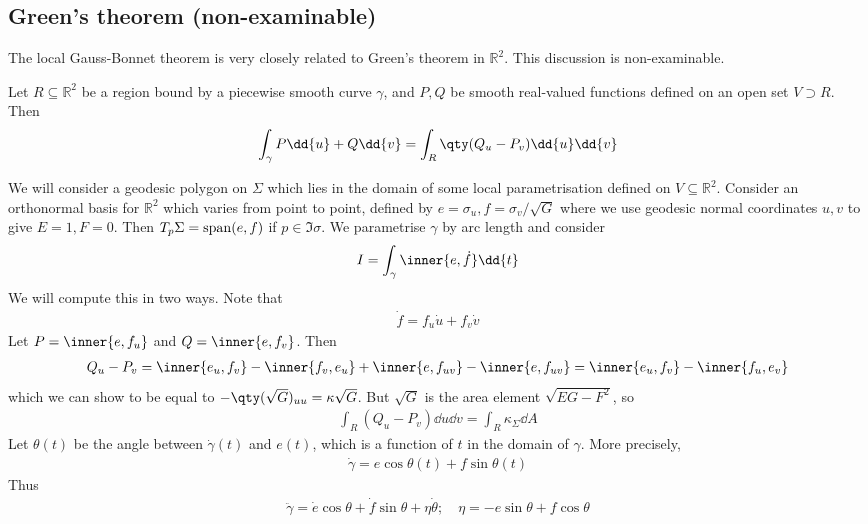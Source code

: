 \subsection{Green's theorem (non-examinable)}
The local Gauss-Bonnet theorem is very closely related to Green's theorem in $\mathbb R^2$.
This discussion is non-examinable.
\begin{theorem}
	Let $R \subseteq \mathbb R^2$ be a region bound by a piecewise smooth curve $\gamma$, and $P, Q$ be smooth real-valued functions defined on an open set $V \supset R$.
	Then
	\begin{align*}
		\int_\gamma P \dd{u}+ Q \dd{v} = \int_R \qty(Q_u - P_v) \dd{u} \dd{v}
	\end{align*}
\end{theorem}
We will consider a geodesic polygon on $\Sigma$ which lies in the domain of some local parametrisation defined on $V \subseteq \mathbb R^2$.
Consider an orthonormal basis for $\mathbb R^2$ which varies from point to point, defined by $e = \sigma_u, f = \sigma_v/\sqrt{G}$ where we use geodesic normal coordinates $u,v$ to give $E = 1, F = 0$.
Then $T_p \Sigma = \operatorname{span}(e,f)$ if $p \in \Im \sigma$.
We parametrise $\gamma$ by arc length and consider
\begin{align*}
	I = \int_\gamma \inner{e,\dot f} \dd{t}
\end{align*}
We will compute this in two ways.
Note that
\begin{align*}
	\dot f = f_u \dot u + f_v \dot v
\end{align*}
Let $P = \inner{e,f_u}$ and $Q = \inner{e,f_v}$.
Then
\begin{align*}
	Q_u - P_v = \inner{e_u, f_v} - \inner{f_v, e_u} + \inner{e, f_{uv}} - \inner{e, f_{uv}} = \inner{e_u, f_v} - \inner{f_u, e_v}
\end{align*}
which we can show to be equal to $-\qty(\sqrt{G})_{uu} = \kappa \sqrt{G}$.
But $\sqrt{G}$ is the area element $\sqrt{EG-F^2}$, so
\begin{align*}
	\int_R (Q_u - P_v) \dd{u} \dd{v} = \int_R \kappa_\Sigma \dd{A}
\end{align*}
Let $\theta(t)$ be the angle between $\dot\gamma(t)$ and $e(t)$, which is a function of $t$ in the domain of $\gamma$.
More precisely,
\begin{align*}
	\dot \gamma = e \cos \theta(t) + f \sin \theta(t)
\end{align*}
Thus
\begin{align*}
	\ddot \gamma = \dot e \cos \theta + \dot f \sin \theta + \eta \dot \theta;\quad \eta = -e\sin \theta + f \cos \theta
\end{align*}
